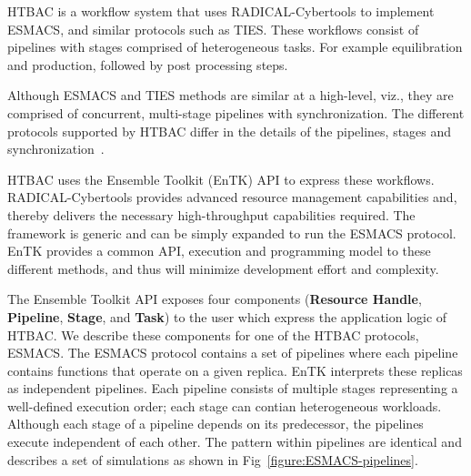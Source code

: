 


HTBAC is a workflow system that uses RADICAL-Cybertools to implement ESMACS,
and similar protocols such as TIES\@. These workflows consist of pipelines
with stages comprised of heterogeneous tasks. For example equilibration and
production, followed by post processing steps.

Although ESMACS and TIES methods are similar at a high-level, viz., they are
comprised of concurrent, multi-stage pipelines with synchronization. The
different protocols supported by HTBAC differ in the details of the
pipelines, stages and synchronization~\cite{Bhati2017}.

HTBAC uses the Ensemble Toolkit (EnTK) API to express these workflows.
RADICAL-Cybertools provides advanced resource management capabilities and,
thereby delivers the necessary high-throughput capabilities required. The
framework is generic and can be simply expanded to run the ESMACS protocol.
EnTK provides a common API, execution and programming model to these
different methods, and thus will minimize development effort and complexity.

The Ensemble Toolkit API exposes four components (\textbf{Resource Handle},
\textbf{Pipeline}, \textbf{Stage}, and \textbf{Task}) to the user which
express the application logic of HTBAC\@. We describe these components for
one of the HTBAC protocols, ESMACS\@. The ESMACS protocol contains a set of
pipelines where each pipeline contains functions that operate on a given
replica. EnTK interprets these replicas as independent pipelines. Each
pipeline consists of multiple stages representing a well-defined execution
order; each stage can contian heterogeneous workloads. Although each stage of
a pipeline depends on its predecessor, the pipelines execute independent of
each other. The pattern within pipelines are identical and describes a set of
simulations as shown in Fig~\ref{figure:ESMACS-pipelines}.

